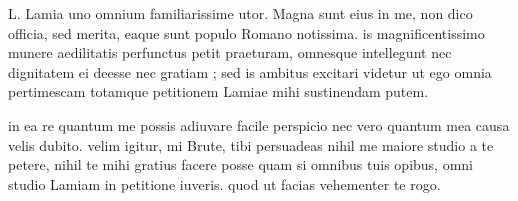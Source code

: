 


 L. Lamia uno omnium familiarissime utor. Magna sunt eius in me, non dico officia, sed merita, eaque sunt populo Romano notissima. is magnificentissimo munere aedilitatis perfunctus petit praeturam, omnesque intellegunt nec dignitatem ei deesse nec gratiam ; sed is ambitus excitari videtur ut ego omnia pertimescam totamque petitionem Lamiae mihi sustinendam putem.

 in ea re quantum me possis adiuvare facile perspicio nec vero quantum mea causa velis dubito. velim igitur, mi Brute, tibi persuadeas nihil me maiore studio a te petere, nihil te mihi gratius facere posse quam si omnibus tuis opibus, omni studio Lamiam in petitione iuveris. quod ut facias vehementer te rogo.
